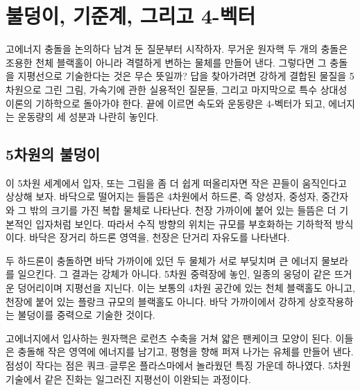 \chapter{불덩이, 기준계, 그리고 4-벡터}

고에너지 충돌을 논의하다 남겨 둔 질문부터 시작하자. 무거운 원자핵 두 개의 충돌은 조용한 천체 블랙홀이 아니라 격렬하게 변하는 물체를 만들어 낸다. 그렇다면 그 충돌을 지평선으로 기술한다는 것은 무슨 뜻일까? 답을 찾아가려면 강하게 결합된 물질을 5차원으로 그린 그림, 가속기에 관한 실용적인 질문들, 그리고 마지막으로 특수 상대성 이론의 기하학으로 돌아가야 한다. 끝에 이르면 속도와 운동량은 4-벡터가 되고, 에너지는 운동량의 세 성분과 나란히 놓인다.

\section{5차원의 불덩이}

\begin{classroomqa}
\end{classroomqa}

이 5차원 세계에서 입자, 또는 그림을 좀 더 쉽게 떠올리자면 작은 끈들이 움직인다고 상상해 보자. 바닥으로 떨어지는 들뜸은 4차원에서 하드론, 즉 양성자, 중성자, 중간자와 그 밖의 크기를 가진 복합 물체로 나타난다. 천장 가까이에 붙어 있는 들뜸은 더 기본적인 입자처럼 보인다. 따라서 수직 방향의 위치는 규모를 부호화하는 기하학적 방식이다. 바닥은 장거리 하드론 영역을, 천장은 단거리 자유도를 나타낸다.

두 하드론이 충돌하면 바닥 가까이에 있던 두 물체가 서로 부딪치며 큰 에너지 물보라를 일으킨다. 그 결과는 강체가 아니다. 5차원 중력장에 놓인, 일종의 웅덩이 같은 뜨거운 덩어리이며 지평선을 지닌다. 이는 보통의 4차원 공간에 있는 천체 블랙홀도 아니고, 천장에 붙어 있는 플랑크 규모의 블랙홀도 아니다. 바닥 가까이에서 강하게 상호작용하는 불덩이를 중력으로 기술한 것이다.

고에너지에서 입사하는 원자핵은 로런츠 수축을 거쳐 얇은 팬케이크 모양이 된다. 이들은 충돌해 작은 영역에 에너지를 남기고, 평형을 향해 퍼져 나가는 유체를 만들어 낸다. 점성이 작다는 점은 쿼크--글루온 플라스마에서 놀라웠던 특징 가운데 하나였다. 5차원 기술에서 같은 진화는 일그러진 지평선이 이완되는 과정이다.

